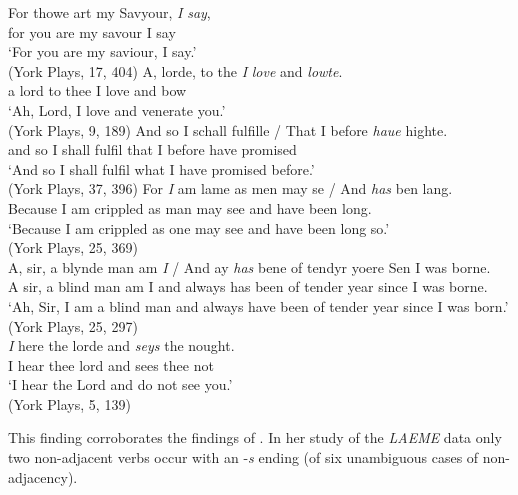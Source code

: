 \documentclass[output=paper]{langsci/langscibook}
\begin{document}
\ea
\label{york1}
\ea \gll For thowe art my Savyour, \textit{I} \textit{say},\\
for you are my savour I say \\
\glt `For you are my saviour, I say.'\\
(York Plays, 17, 404)
\ex \gll A, lorde, to the \textit{I} \textit{love} and \textit{lowte}.\\
a lord  to thee I love and bow\\
\glt `Ah, Lord, I love and venerate you.'\\
(York Plays, 9, 189)
\ex \gll And so I schall fulfille / That I before \textit{haue} highte.\\
and so I shall fulfil {} that I before have promised \\
\glt `And so I shall fulfil what I have promised before.'\\
(York Plays, 37, 396)
\z
\ex\label{york2}
\ea
\gll For \textit{I} am lame as men may se / And \textit{has} ben lang. \\
Because I am crippled as man may see and have been long.\\
\glt `Because I am crippled as one may see and have been long so.'\\
(York Plays, 25, 369)\\
\ex \gll A, sir, a blynde man am \textit{I} / And ay \textit{has} bene of tendyr yoere Sen
I was borne.\\
A sir, a blind man am I and always has been of tender year since I was borne.\\
\glt `Ah, Sir, I am a blind man and always have been of tender year since I was born.'\\
(York Plays, 25, 297)\\
\ex \gll \textit{I} here the lorde and \textit{seys} the nought.\\
I hear thee lord and sees thee not\\
\glt `I hear the Lord and do not see you.'\\
(York Plays, 5, 139)\\
\z
\z

This finding corroborates the findings of \textcite{Fernandez-Cuesta:2011}. In
her study of the \emph{LAEME} data only two non-adjacent \Fsg{} verbs occur
with an -\emph{s} ending (of six unambiguous cases of non-adjacency).
\end{document}
